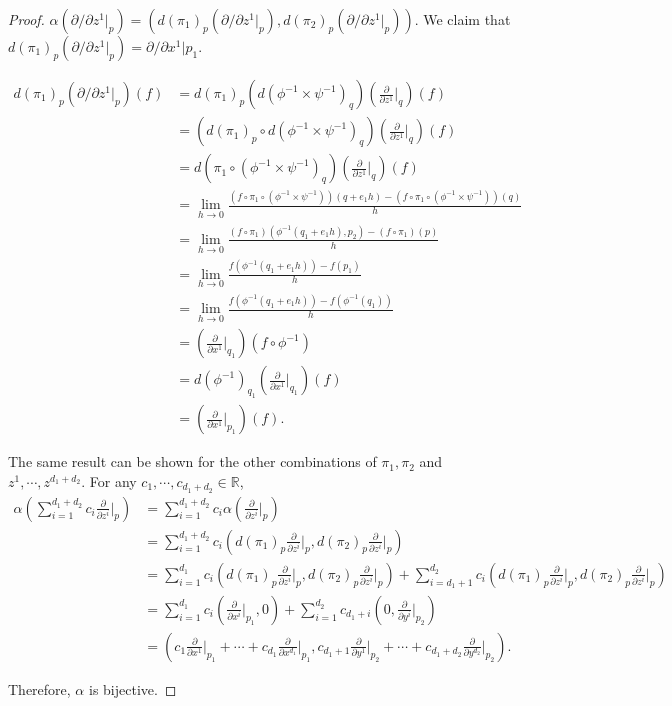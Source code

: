 \begin{proof}
  $\alpha(\partial / \partial z^1 \vert_p) = (d(\pi_1)_p(\partial/\partial z^1\vert_p), d(\pi_2)_p(\partial/\partial z^1\vert_p))$.
  We claim that $d(\pi_1)_p(\partial / \partial z^1 \vert_p) = \partial / \partial x^1 \vert p_1$.

  \begin{align*}
    d(\pi_1)_p(\partial / \partial z^1 \vert_p)(f)
      &= d(\pi_1)_p(d(\phi^{-1} \times \psi^{-1})_q)(\frac{\partial}{\partial z^1}\vert_q) (f)\\
      &= (d(\pi_1)_p \circ d(\phi^{-1} \times \psi^{-1})_q)(\frac{\partial}{\partial z^1}\vert_q) (f)\\
      &= d(\pi_1 \circ (\phi^{-1} \times \psi^{-1})_q)(\frac{\partial}{\partial z^1}\vert_q) (f)\\
      &= \lim_{h \rightarrow 0} \frac{(f \circ \pi_1 \circ (\phi^{-1} \times \psi^{-1}))(q + e_1h) - (f \circ \pi_1 \circ (\phi^{-1} \times \psi^{-1}))(q)}{h} \\
      &= \lim_{h \rightarrow 0} \frac{(f \circ \pi_1)(\phi^{-1}(q_1 + e_1h), p_2) - (f \circ \pi_1)(p)}{h} \\
      &= \lim_{h \rightarrow 0} \frac{f(\phi^{-1}(q_1 + e_1h)) - f(p_1)}{h} \\
      &= \lim_{h \rightarrow 0} \frac{f(\phi^{-1}(q_1 + e_1h)) - f(\phi^{-1}(q_1))}{h} \\
      &= (\frac{\partial}{\partial x^1}\vert_{q_1})(f \circ \phi^{-1}) \\
      &= d(\phi^{-1})_{q_1}(\frac{\partial}{\partial x^1}\vert_{q_1})(f) \\
      &= (\frac{\partial}{\partial x^1}\vert_{p_1})(f).
  \end{align*}

  The same result can be shown for the other combinations of $\pi_1, \pi_2$ and $z^1, \cdots, z^{d_1 + d_2}$.
  For any $c_1, \cdots, c_{d_1 + d_2} \in \mathbb{R}$,
  \begin{align*}
    \alpha(\sum_{i=1}^{d_1 + d_2} c_{i}\frac{\partial}{\partial z^{i}}\vert_p)
      &= \sum_{i=1}^{d_1 + d_2} c_i\alpha(\frac{\partial}{\partial z^{i}}\vert_p) \\
      &= \sum_{i=1}^{d_1 + d_2} c_i(d(\pi_1)_p\frac{\partial}{\partial z^{i}}\vert_p, d(\pi_2)_p\frac{\partial}{\partial z^i}\vert_p) \\
      &= \sum_{i=1}^{d_1} c_i(d(\pi_1)_p\frac{\partial}{\partial z^{i}}\vert_p, d(\pi_2)_p\frac{\partial}{\partial z^i}\vert_p) 
         + \sum_{i=d_1 + 1}^{d_2} c_i(d(\pi_1)_p\frac{\partial}{\partial z^{i}}\vert_p, d(\pi_2)_p\frac{\partial}{\partial z^i}\vert_p) \\
      &= \sum_{i=1}^{d_1} c_i(\frac{\partial}{\partial x^i} \vert_{p_1}, 0)
         + \sum_{i=1}^{d_2} c_{d_1 + i}(0, \frac{\partial}{\partial y^i} \vert_{p_2}) \\
      &= (c_1\frac{\partial}{\partial x^1}\vert_{p_1} + \cdots + c_{d_1}\frac{\partial}{\partial x^{d_1}}\vert_{p_1},
          c_{d_1 + 1}\frac{\partial}{\partial y^{1}}\vert_{p_2} + \cdots + c_{d_1 + d_2}\frac{\partial}{\partial y^{d_2}}\vert_{p_2}).
  \end{align*}

  Therefore, $\alpha$ is bijective.
\end{proof}
